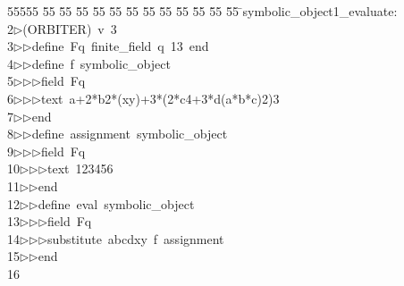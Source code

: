 %
%
\begin{tabbing}
55555 \= 55 \= 55 \= 55 \= 55 \= 55 \= 55 \= 55 \= 55 \= 55 \= 55 \= 55 \= 55 \= \>symbolic\_object1\_evaluate:\\[0pt]
2\>$\triangleright$\>(ORBITER)\ v\ 3\ \\[0pt]
3\>$\triangleright$\>$\triangleright$\>define\ Fq\ finite\_field\ q\ 13\ end\ \\[0pt]
4\>$\triangleright$\>$\triangleright$\>define\ f\ symbolic\_object\ \\[0pt]
5\>$\triangleright$\>$\triangleright$\>$\triangleright$\>field\ Fq\ \\[0pt]
6\>$\triangleright$\>$\triangleright$\>$\triangleright$\>text\ a+2*b2*(xy)+3*(2*c4+3*d(a*b*c)2)3\ \\[0pt]
7\>$\triangleright$\>$\triangleright$\>end\ \\[0pt]
8\>$\triangleright$\>$\triangleright$\>define\ assignment\ symbolic\_object\ \\[0pt]
9\>$\triangleright$\>$\triangleright$\>$\triangleright$\>field\ Fq\ \\[0pt]
10\>$\triangleright$\>$\triangleright$\>$\triangleright$\>text\ 123456\ \\[0pt]
11\>$\triangleright$\>$\triangleright$\>end\ \\[0pt]
12\>$\triangleright$\>$\triangleright$\>define\ eval\ symbolic\_object\ \\[0pt]
13\>$\triangleright$\>$\triangleright$\>$\triangleright$\>field\ Fq\ \\[0pt]
14\>$\triangleright$\>$\triangleright$\>$\triangleright$\>substitute\ abcdxy\ f\ assignment\ \\[0pt]
15\>$\triangleright$\>$\triangleright$\>end\\[0pt]
16\>\end{tabbing}

